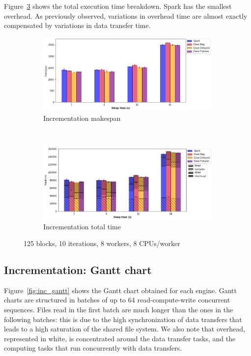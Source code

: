 \documentclass[conference]{IEEEtran}
\begin{document}
Figure~\ref{fig:inc_tt_sleep} shows the total execution time breakdown. Spark has the
smallest overhead. As previously observed, variations in overhead time are almost
exactly compensated by variations in data transfer time.

\begin{figure}[!b]
    \centering
    \begin{subfigure}[b]{\columnwidth}
        \includegraphics[clip,width=\columnwidth]{images/inc_sleep.png}%
        \caption{Incrementation makespan}\label{fig:inc_ms_sleep}
    \end{subfigure}
    \\
    \begin{subfigure}[b]{\columnwidth}
        \includegraphics[clip,width=\columnwidth]{images/inc_idle_sleep.png}%
        \caption{Incrementation total time}\label{fig:inc_tt_sleep}
    \end{subfigure}
    \caption{125 blocks, 10 iterations, 8 workers, 8 CPUs/worker}
\end{figure}

\subsection{Incrementation: Gantt chart}

Figure~\ref{fig:inc_gantt} shows the Gantt chart obtained for each engine. Gantt
charts are structured in batches of up to 64 read-compute-write concurrent sequences.
Files read in the first batch are much longer than the ones in the following batches:
this is due to the high synchronization of data transfers that leads to a high
saturation of the shared file system. We also note that overhead, represented in
white, is concentrated around the data transfer tasks, and the
computing tasks that run concurrently with data transfers. 
\end{document}
